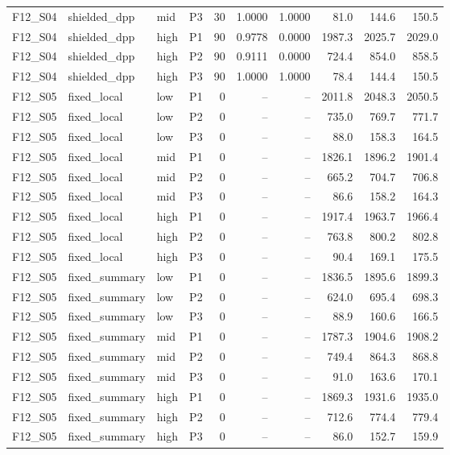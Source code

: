 \begin{longtable}{llllrrrrrr}
F12\_S04 & shielded\_dpp & mid & P3 & 30 & 1.0000 & 1.0000 & 81.0 & 144.6 & 150.5 \\
F12\_S04 & shielded\_dpp & high & P1 & 90 & 0.9778 & 0.0000 & 1987.3 & 2025.7 & 2029.0 \\
F12\_S04 & shielded\_dpp & high & P2 & 90 & 0.9111 & 0.0000 & 724.4 & 854.0 & 858.5 \\
F12\_S04 & shielded\_dpp & high & P3 & 90 & 1.0000 & 1.0000 & 78.4 & 144.4 & 150.5 \\
F12\_S05 & fixed\_local & low & P1 & 0 & -- & -- & 2011.8 & 2048.3 & 2050.5 \\
F12\_S05 & fixed\_local & low & P2 & 0 & -- & -- & 735.0 & 769.7 & 771.7 \\
F12\_S05 & fixed\_local & low & P3 & 0 & -- & -- & 88.0 & 158.3 & 164.5 \\
F12\_S05 & fixed\_local & mid & P1 & 0 & -- & -- & 1826.1 & 1896.2 & 1901.4 \\
F12\_S05 & fixed\_local & mid & P2 & 0 & -- & -- & 665.2 & 704.7 & 706.8 \\
F12\_S05 & fixed\_local & mid & P3 & 0 & -- & -- & 86.6 & 158.2 & 164.3 \\
F12\_S05 & fixed\_local & high & P1 & 0 & -- & -- & 1917.4 & 1963.7 & 1966.4 \\
F12\_S05 & fixed\_local & high & P2 & 0 & -- & -- & 763.8 & 800.2 & 802.8 \\
F12\_S05 & fixed\_local & high & P3 & 0 & -- & -- & 90.4 & 169.1 & 175.5 \\
F12\_S05 & fixed\_summary & low & P1 & 0 & -- & -- & 1836.5 & 1895.6 & 1899.3 \\
F12\_S05 & fixed\_summary & low & P2 & 0 & -- & -- & 624.0 & 695.4 & 698.3 \\
F12\_S05 & fixed\_summary & low & P3 & 0 & -- & -- & 88.9 & 160.6 & 166.5 \\
F12\_S05 & fixed\_summary & mid & P1 & 0 & -- & -- & 1787.3 & 1904.6 & 1908.2 \\
F12\_S05 & fixed\_summary & mid & P2 & 0 & -- & -- & 749.4 & 864.3 & 868.8 \\
F12\_S05 & fixed\_summary & mid & P3 & 0 & -- & -- & 91.0 & 163.6 & 170.1 \\
F12\_S05 & fixed\_summary & high & P1 & 0 & -- & -- & 1869.3 & 1931.6 & 1935.0 \\
F12\_S05 & fixed\_summary & high & P2 & 0 & -- & -- & 712.6 & 774.4 & 779.4 \\
F12\_S05 & fixed\_summary & high & P3 & 0 & -- & -- & 86.0 & 152.7 & 159.9 \\

\end{longtable}

